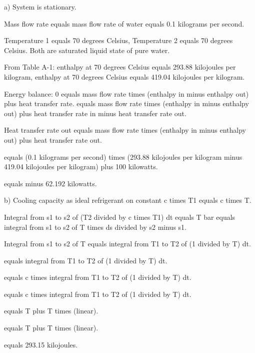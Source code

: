 a) System is stationary.

Mass flow rate equals mass flow rate of water equals 0.1 kilograms per second.

Temperature 1 equals 70 degrees Celsius, Temperature 2 equals 70 degrees Celsius. Both are saturated liquid state of pure water.

From Table A-1: enthalpy at 70 degrees Celsius equals 293.88 kilojoules per kilogram, enthalpy at 70 degrees Celsius equals 419.04 kilojoules per kilogram.

Energy balance:
0 equals mass flow rate times (enthalpy in minus enthalpy out) plus heat transfer rate.
equals mass flow rate times (enthalpy in minus enthalpy out) plus heat transfer rate in minus heat transfer rate out.

Heat transfer rate out equals mass flow rate times (enthalpy in minus enthalpy out) plus heat transfer rate out.

equals (0.1 kilograms per second) times (293.88 kilojoules per kilogram minus 419.04 kilojoules per kilogram) plus 100 kilowatts.

equals minus 62.192 kilowatts.

b) Cooling capacity as ideal refrigerant on constant c times T1 equals c times T.

Integral from s1 to s2 of (T2 divided by c times T1) dt equals T bar equals integral from s1 to s2 of T times ds divided by s2 minus s1.

Integral from s1 to s2 of T equals integral from T1 to T2 of (1 divided by T) dt.

equals integral from T1 to T2 of (1 divided by T) dt.

equals c times integral from T1 to T2 of (1 divided by T) dt.

equals c times integral from T1 to T2 of (1 divided by T) dt.

equals T plus T times (linear).

equals T plus T times (linear).

equals 293.15 kilojoules.